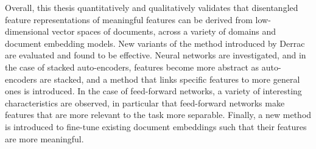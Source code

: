 \documentclass[a4paper,oneside,onecolumn,openright,12pt]{book}
\begin{document}
Overall, this thesis quantitatively and qualitatively validates  that disentangled feature representations of meaningful features can be derived from low-dimensional vector spaces of documents, across a variety of domains and document embedding models.  New variants of the method introduced by Derrac \cite{Derrac2015} are evaluated and found to be effective. Neural networks are investigated, and in the case of  stacked auto-encoders,  features become more abstract as auto-encoders are stacked, and a method that links specific features to more general ones is introduced. In the case of feed-forward networks, a variety of interesting characteristics are observed, in particular that feed-forward networks make features that are more relevant to the task more separable. Finally, a new method is introduced to fine-tune existing document embeddings such that their features are more meaningful. 









 




 
\end{document}
